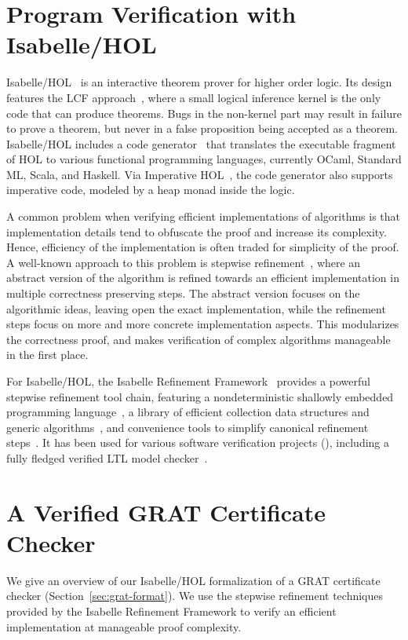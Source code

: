 \documentclass[smallcondensed]{svjour3}     %
\begin{document}
\section{Program Verification with Isabelle/HOL}\label{sec:imp_ref_framework}
Isabelle/HOL~\cite{NPW02} is an interactive theorem prover for higher order logic. Its design features the LCF approach~\cite{Gord00}, where 
a small logical inference kernel is the only code that can produce theorems. Bugs in the non-kernel part may result in failure to 
prove a theorem, but never in a false proposition being accepted as a theorem.
Isabelle/HOL includes a code generator~\cite{Haft09,HaNi10,HKKN13} that translates the executable fragment of HOL to various functional programming languages, 
currently OCaml, Standard ML, Scala, and Haskell.
Via Imperative HOL~\cite{BKHEM08}, the code generator also supports imperative code, modeled by a heap monad inside the logic.

A common problem when verifying efficient implementations of algorithms is that implementation details tend to obfuscate the proof and increase its complexity. 
Hence, efficiency of the implementation is often traded for simplicity of the proof.
A well-known approach to this problem is stepwise refinement~\cite{Wirth71,Back78,BaWr98}, where an abstract version of the algorithm is refined towards 
an efficient implementation in multiple correctness preserving steps.
The abstract version focuses on the 
algorithmic ideas, leaving open the exact implementation, while the refinement steps focus on more and more concrete implementation aspects.
This modularizes the correctness proof, and makes verification of complex algorithms manageable in the first place.

For Isabelle/HOL, the Isabelle Refinement Framework~\cite{LaTu12,La13,La15,La16} provides a powerful stepwise refinement tool chain, 
featuring a nondeterministic shallowly embedded programming language~\cite{LaTu12}, a library of efficient collection data structures and generic algorithms~\cite{LL10,La15,La16},
and convenience tools to simplify canonical refinement steps~\cite{La13,La15}. It has been used for various software verification projects (\eg \cite{La14,LaSe16,LaNe15}), 
including a fully fledged verified LTL model checker~\cite{ELNN13,BrLa16}.

\section{A Verified GRAT Certificate Checker}\label{sec:grat_verified}
We give an overview of our Isabelle/HOL formalization of a GRAT certificate checker (\cf Section~\ref{sec:grat-format}).
We use the stepwise refinement techniques provided by the Isabelle Refinement Framework to verify an efficient implementation at manageable proof complexity.
\end{document}
